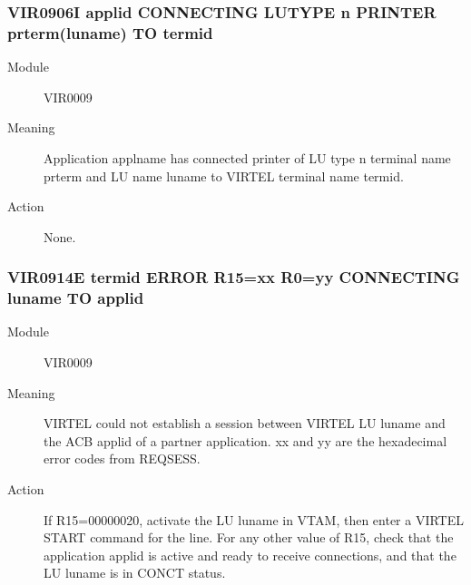\documentclass[letterpaper,10pt,english]{sphinxmanual}
\begin{document}
\subsubsection{VIR0906I applid CONNECTING LUTYPE n PRINTER prterm(luname) TO termid}
\label{\detokenize{messages:vir0906i-applid-connecting-lutype-n-printer-prterm-luname-to-termid}}\begin{description}
\item[{Module}] \leavevmode
VIR0009

\item[{Meaning}] \leavevmode
Application applname has connected printer of LU type n terminal name prterm and LU name luname to VIRTEL terminal name termid.

\item[{Action}] \leavevmode
None.

\end{description}


\subsubsection{VIR0914E termid ERROR R15=xx R0=yy CONNECTING luname TO applid}
\label{\detokenize{messages:vir0914e-termid-error-r15-xx-r0-yy-connecting-luname-to-applid}}\begin{description}
\item[{Module}] \leavevmode
VIR0009

\item[{Meaning}] \leavevmode
VIRTEL could not establish a session between VIRTEL LU luname and the ACB applid of a partner application. xx and yy are the hexadecimal error codes from REQSESS.

\item[{Action}] \leavevmode
If R15=00000020, activate the LU luname in VTAM, then enter a VIRTEL START command for the line. For any other value of R15, check that the application applid is active and ready to receive connections, and that the LU luname is in CONCT status.

\end{description}
\end{document}
